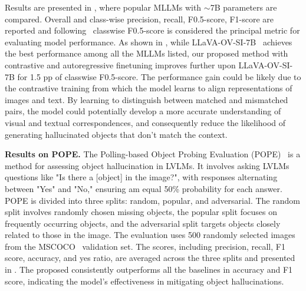 Results are presented in , where popular MLLMs with $\sim$7B parameters are compared. Overall and class-wise precision, recall, F0.5-score, F1-score are reported and following~\cite{kaul2024throne} classwise F0.5-score is considered the principal metric for evaluating model performance. As shown in , while LLaVA-OV-SI-7B~\citep{li2024llava} achieves the best performance among all the MLLMs listed, our proposed method with contrastive and autoregressive finetuning improves further upon LLaVA-OV-SI-7B for 1.5 pp of classwise F0.5-score. The performance gain could be likely due to the contrastive training from which the model learns to align representations of images and text. By learning to distinguish between matched and mismatched pairs, the model could potentially develop a more accurate understanding of visual and textual correspondences, and consequently reduce the likelihood of generating hallucinated objects that don't match the context.

\noindent\textbf{Results on POPE.} The Polling-based Object Probing Evaluation (POPE)~\citep{li2023evaluating} is a method for assessing object hallucination in LVLMs. It involves asking LVLMs questions like "Is there a [object] in the image?", with responses alternating between "Yes" and "No," ensuring am equal 50\% probability for each answer. POPE is divided into three splits: random, popular, and adversarial. The random split involves randomly chosen missing objects, the popular split focuses on frequently occurring objects, and the adversarial split targets objects closely related to those in the image. The evaluation uses 500 randomly selected images from the MSCOCO~\citep{Chen2015MicrosoftCC} validation set. The scores, including precision, recall, F1 score, accuracy, and yes ratio, are averaged across the three splits and presented in . The proposed \algname consistently outperforms all the baselines in accuracy and F1 score, indicating the model's effectiveness in mitigating object hallucinations.
